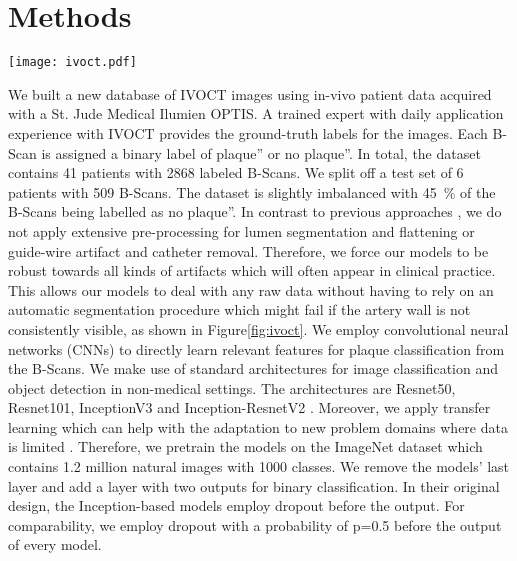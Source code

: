 \section{Methods}

\begin{figure*}
  \centering
  \texttt{[image: ivoct.pdf]}
\caption{Left, a cartesian IVOCT image is shown. Right, the polar image is shown. Note, that there are various artifacts in the vessel which impede a clear view of the vessel wall. Lipid-rich plaque is visible in this image. *’ denotes the guide-wire artifact.}
\label{fig:ivoct}       %
\end{figure*}

We built a new database of IVOCT images using in-vivo patient data acquired with a St. Jude Medical Ilumien OPTIS. A trained expert with daily application experience with IVOCT provides the ground-truth labels for the images. Each B-Scan is assigned a binary label of plaque” or no plaque”. In total, the dataset contains 41 patients with 2868 labeled B-Scans. We split off a test set of 6 patients with 509 B-Scans. The dataset is slightly imbalanced with \SI{45}{\percent} of the B-Scans being labelled as no plaque”.
In contrast to previous approaches \cite{ughi2013automated,rico2016automatic}, we do not apply extensive pre-processing for lumen segmentation and flattening or guide-wire artifact and catheter removal. Therefore, we force our models to be robust towards all kinds of artifacts which will often appear in clinical practice. This allows our models to deal with any raw data without having to rely on an automatic segmentation procedure which might fail if the artery wall is not consistently visible, as shown in Figure\ref{fig:ivoct}.
We employ convolutional neural networks (CNNs) to directly learn relevant features for plaque classification from the B-Scans.  We make use of standard architectures for image classification and object detection in non-medical settings. The architectures are Resnet50, Resnet101, InceptionV3 and Inception-ResnetV2 \cite{litjens2017survey,Szegedy.2017}. Moreover, we apply transfer learning which can help with the adaptation to new problem domains where data is limited \cite{ravishankar2016understanding}. Therefore, we pretrain the models on the ImageNet dataset which contains 1.2 million natural images with 1000 classes. We remove the models’ last layer and add a layer with two outputs for binary classification. In their original design, the Inception-based models employ dropout before the output. For comparability, we employ dropout with a probability of p=0.5 before the output of every model.
